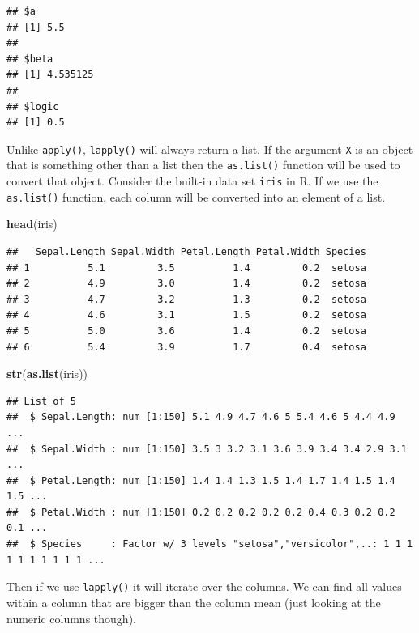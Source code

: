\documentclass[
]{book}
\newenvironment{Shaded}{\begin{snugshade}}{\end{snugshade}}
\newcommand{\KeywordTok}[1]{\textcolor[rgb]{0.13,0.29,0.53}{\textbf{#1}}}
\newcommand{\NormalTok}[1]{#1}
\begin{document}
\begin{verbatim}
## $a
## [1] 5.5
## 
## $beta
## [1] 4.535125
## 
## $logic
## [1] 0.5
\end{verbatim}

Unlike \texttt{apply()}, \texttt{lapply()} will always return a list. If the argument \texttt{X} is an object that is something other than a list then the \texttt{as.list()} function will be used to convert that object. Consider the built-in data set \texttt{iris} in R. If we use the \texttt{as.list()} function, each column will be converted into an element of a list.

\begin{Shaded}
\begin{Highlighting}[]
\KeywordTok{head}\NormalTok{(iris)}
\end{Highlighting}
\end{Shaded}

\begin{verbatim}
##   Sepal.Length Sepal.Width Petal.Length Petal.Width Species
## 1          5.1         3.5          1.4         0.2  setosa
## 2          4.9         3.0          1.4         0.2  setosa
## 3          4.7         3.2          1.3         0.2  setosa
## 4          4.6         3.1          1.5         0.2  setosa
## 5          5.0         3.6          1.4         0.2  setosa
## 6          5.4         3.9          1.7         0.4  setosa
\end{verbatim}

\begin{Shaded}
\begin{Highlighting}[]
\KeywordTok{str}\NormalTok{(}\KeywordTok{as.list}\NormalTok{(iris))}
\end{Highlighting}
\end{Shaded}

\begin{verbatim}
## List of 5
##  $ Sepal.Length: num [1:150] 5.1 4.9 4.7 4.6 5 5.4 4.6 5 4.4 4.9 ...
##  $ Sepal.Width : num [1:150] 3.5 3 3.2 3.1 3.6 3.9 3.4 3.4 2.9 3.1 ...
##  $ Petal.Length: num [1:150] 1.4 1.4 1.3 1.5 1.4 1.7 1.4 1.5 1.4 1.5 ...
##  $ Petal.Width : num [1:150] 0.2 0.2 0.2 0.2 0.2 0.4 0.3 0.2 0.2 0.1 ...
##  $ Species     : Factor w/ 3 levels "setosa","versicolor",..: 1 1 1 1 1 1 1 1 1 1 ...
\end{verbatim}

Then if we use \texttt{lapply()} it will iterate over the columns. We can find all values within a column that are bigger than the column mean (just looking at the numeric columns though).
\end{document}
